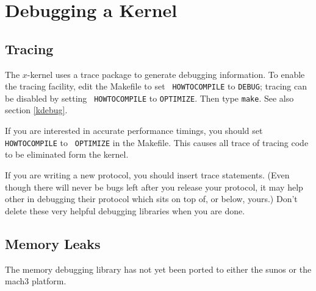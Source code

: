%
%
%

\section{Debugging a Kernel}

\subsection{Tracing}
\label{debug}
The $x$-kernel uses a trace package to generate debugging information.
To enable the tracing facility, edit the Makefile to set {\tt
HOWTOCOMPILE} to {\tt DEBUG}; tracing can be disabled by setting {\tt
HOWTOCOMPILE} to {\tt OPTIMIZE}. Then type {\tt make}.  See also
section \ref{kdebug}.

If you are interested in accurate
performance timings, you should set {\tt HOWTOCOMPILE} to {\tt
OPTIMIZE} in the Makefile.  This causes all trace of tracing code to
be eliminated form the kernel.

If you are writing a new protocol, you should insert trace statements.
(Even though there will never be bugs left after you release your
protocol, it may help other in debugging their protocol which sits
on top of, or below, yours.)  Don't delete these very helpful debugging
libraries when you are done.

\subsection{Memory Leaks}

The memory debugging library has not yet been ported to either the
sunos or the mach3 platform.
